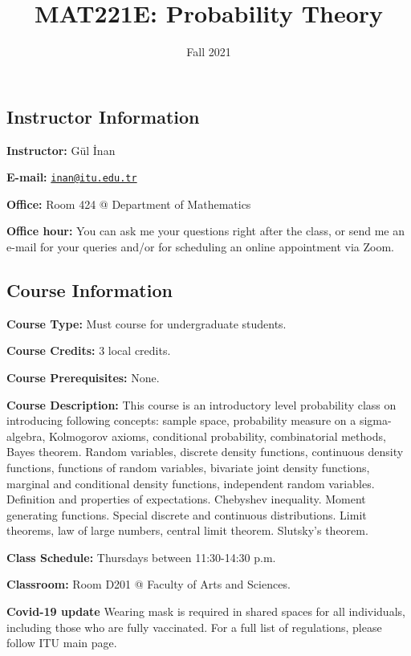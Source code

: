 \documentclass[
  12pt,
]{article}
\title{MAT221E: Probability Theory}
\author{}
\date{\vspace{-2.5em}Fall 2021}
\begin{document}
\maketitle

\hypertarget{instructor-information}{%
\subsection{Instructor Information}\label{instructor-information}}

\textbf{Instructor:} Gül İnan

\textbf{E-mail:}
\href{mailto:inan@itu.edu.tr}{\nolinkurl{inan@itu.edu.tr}}

\textbf{Office:} Room 424 @ Department of Mathematics

\textbf{Office hour:} You can ask me your questions right after the
class, or send me an e-mail for your queries and/or for scheduling an
online appointment via Zoom.

\hypertarget{course-information}{%
\subsection{Course Information}\label{course-information}}

\textbf{Course Type:} Must course for undergraduate students.

\textbf{Course Credits:} 3 local credits.

\textbf{Course Prerequisites:} None.

\textbf{Course Description:} This course is an introductory level
probability class on introducing following concepts: sample space,
probability measure on a sigma-algebra, Kolmogorov axioms, conditional
probability, combinatorial methods, Bayes theorem. Random variables,
discrete density functions, continuous density functions, functions of
random variables, bivariate joint density functions, marginal and
conditional density functions, independent random variables. Definition
and properties of expectations. Chebyshev inequality. Moment generating
functions. Special discrete and continuous distributions. Limit
theorems, law of large numbers, central limit theorem. Slutsky's
theorem.

\textbf{Class Schedule:} Thursdays between 11:30-14:30 p.m.

\textbf{Classroom:} Room D201 @ Faculty of Arts and Sciences.

\textbf{Covid-19 update} Wearing mask is required in shared spaces for
all individuals, including those who are fully vaccinated. For a full
list of regulations, please follow ITU main page.
\end{document}
